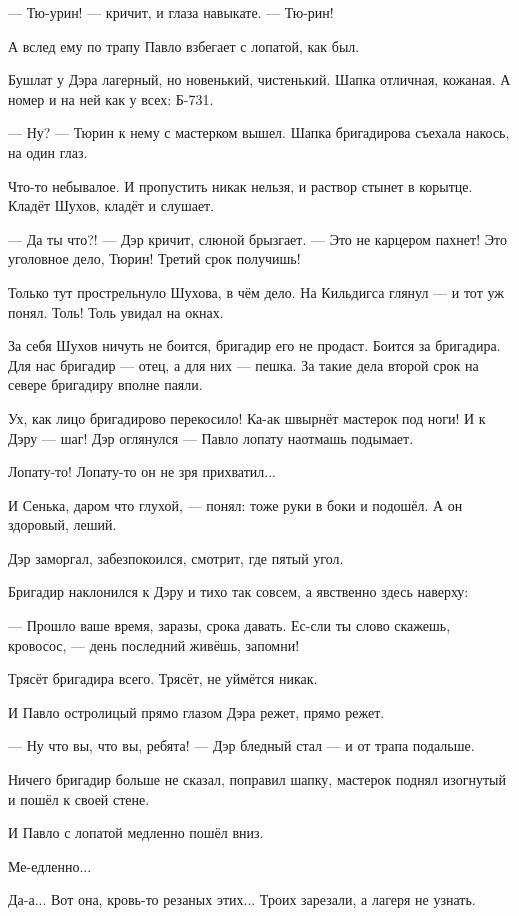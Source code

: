 --- Тю-урин! --- кричит, и глаза навыкате. --- Тю-рин!

А вслед ему по трапу Павло взбегает с лопатой, как был.

Бушлат у Дэра лагерный, но новенький, чистенький. Шапка отличная, кожаная. А номер и на ней
как у всех: Б-731.

--- Ну? --- Тюрин к нему с мастерком вышел. Шапка бригадирова съехала накось, на один глаз.

Что-то небывалое. И пропустить никак нельзя, и раствор стынет в корытце. Кладёт Шухов, кладёт
и слушает.

--- Да ты что?! --- Дэр кричит, слюной брызгает. --- Это не карцером пахнет! Это уголовное дело,
Тюрин! Третий срок получишь!

Только тут прострельнуло Шухова, в чём дело. На Кильдигса глянул --- и тот уж понял. Толь! Толь
увидал на окнах.

За себя Шухов ничуть не боится, бригадир его не продаст. Боится за бригадира. Для нас
бригадир --- отец, а для них --- пешка. За такие дела второй срок на севере бригадиру вполне
паяли.

Ух, как лицо бригадирово перекосило! Ка-ак швырнёт мастерок под ноги! И к Дэру --- шаг! Дэр
оглянулся --- Павло лопату наотмашь подымает.

Лопату-то! Лопату-то он не зря прихватил...

И Сенька, даром что глухой, --- понял: тоже руки в боки и подошёл. А он здоровый, леший.

Дэр заморгал, забезпокоился, смотрит, где пятый угол.

Бригадир наклонился к Дэру и тихо так совсем, а явственно здесь наверху:

--- Прошло ваше время, заразы, срока давать. Ес-сли ты слово скажешь, кровосос, --- день
последний живёшь, запомни!

Трясёт бригадира всего. Трясёт, не уймётся никак.

И Павло остролицый прямо глазом Дэра режет, прямо режет.

--- Ну что вы, что вы, ребята! --- Дэр бледный стал --- и от трапа подальше.

Ничего бригадир больше не сказал, поправил шапку, мастерок поднял изогнутый и пошёл к своей
стене.

И Павло с лопатой медленно пошёл вниз.

Ме-едленно...

Да-а... Вот она, кровь-то резаных этих... Троих зарезали, а лагеря не узнать.

